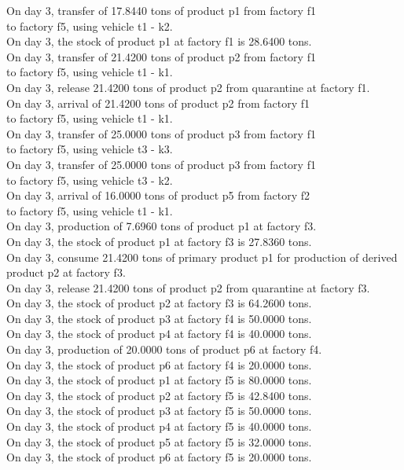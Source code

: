 \begin{tabbing}
On day 3, transfer of 17.8440 tons of product p1 from factory f1 \\ to factory f5, using vehicle t1 - k2. \\
On day 3, the stock of product p1 at factory f1 is 28.6400 tons. \\
On day 3, transfer of 21.4200 tons of product p2 from factory f1 \\ to factory f5, using vehicle t1 - k1. \\
On day 3, release 21.4200 tons of product p2 from quarantine at factory f1. \\
On day 3, arrival of 21.4200 tons of product p2 from factory f1 \\ to factory f5, using vehicle t1 - k1. \\
On day 3, transfer of 25.0000 tons of product p3 from factory f1 \\ to factory f5, using vehicle t3 - k3. \\
On day 3, transfer of 25.0000 tons of product p3 from factory f1 \\ to factory f5, using vehicle t3 - k2. \\
On day 3, arrival of 16.0000 tons of product p5 from factory f2 \\ to factory f5, using vehicle t1 - k1. \\
On day 3, production of 7.6960 tons of product p1 at factory f3. \\
On day 3, the stock of product p1 at factory f3 is 27.8360 tons. \\
On day 3, consume 21.4200 tons of primary product p1 for production of derived product p2 at factory f3. \\
On day 3, release 21.4200 tons of product p2 from quarantine at factory f3. \\
On day 3, the stock of product p2 at factory f3 is 64.2600 tons. \\
On day 3, the stock of product p3 at factory f4 is 50.0000 tons. \\
On day 3, the stock of product p4 at factory f4 is 40.0000 tons. \\
On day 3, production of 20.0000 tons of product p6 at factory f4. \\
On day 3, the stock of product p6 at factory f4 is 20.0000 tons. \\
On day 3, the stock of product p1 at factory f5 is 80.0000 tons. \\
On day 3, the stock of product p2 at factory f5 is 42.8400 tons. \\
On day 3, the stock of product p3 at factory f5 is 50.0000 tons. \\
On day 3, the stock of product p4 at factory f5 is 40.0000 tons. \\
On day 3, the stock of product p5 at factory f5 is 32.0000 tons. \\
On day 3, the stock of product p6 at factory f5 is 20.0000 tons. \\
\end{tabbing} \vspace{-2.0em}
